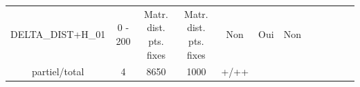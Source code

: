 \begin{landscape}
\begin{tabular}{|c|c|c|c|c|c|c|c|c|c|c|c|}
\begin{minipage}{3.5cm}\vspace{5mm}DELTA\_DIST+H\_01 \vspace{1mm} \end{minipage} &
\begin{minipage}{1.3cm}0 - 200 \end{minipage} &
\begin{minipage}{1.8cm}Matr. dist. pts. fixes \end{minipage} &
\begin{minipage}{1.8cm}Matr. dist. pts. fixes \end{minipage} &
\begin{minipage}{1.4cm}Non \end{minipage} &
\begin{minipage}{1.4cm}Oui \end{minipage} &
\begin{minipage}{2cm} Non \end{minipage} &
\begin{minipage}{1.8cm}RMSE\\ partiel/total \end{minipage}&
\begin{minipage}{1.65cm} 4 \end{minipage}&
\begin{minipage}{1.2cm} 8650 \end{minipage} &
\begin{minipage}{1cm}1000 \end{minipage} &
\begin{minipage}{0.9cm}+/++ \end{minipage} \\  \hline


\end{tabular}
\end{landscape}
